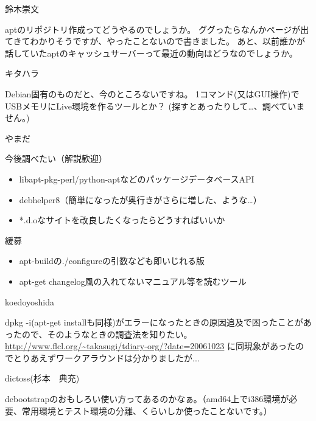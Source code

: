 
\begin{prework}{ 鈴木崇文 }

aptのリポジトリ作成ってどうやるのでしょうか。
ググったらなんかページが出てきてわかりそうですが、やったことないので書きました。
あと、以前誰かが話していたaptのキャッシュサーバーって最近の動向はどうなのでしょうか。

\end{prework}

\begin{prework}{ キタハラ }

Debian固有のものだと、今のところないですね。
1コマンド(又はGUI操作)でUSBメモリにLive環境を作るツールとか？
(探すとあったりして…、調べていません。)

\end{prework}

\begin{prework}{ やまだ }

今後調べたい（解説歓迎）
\begin{itemize}
\item libapt-pkg-perl/python-aptなどのパッケージデータベースAPI
\item debhelper8（簡単になったが奥行きがさらに増した、ような…）
\item *.d.oなサイトを改良したくなったらどうすればいいか
\end{itemize}

緩募
\begin{itemize}
\item apt-buildの./configureの引数なども即いじれる版
\item apt-get changelog風の入れてないマニュアル等を読むツール
\end{itemize}

\end{prework}

\begin{prework}{ koedoyoshida }

dpkg -i(apt-get installも同様)がエラーになったときの原因追及で困ったことがあったので、そのようなときの調査法を知りたい。
\url{http://www.flcl.org/~takasugi/tdiary-org/?date=20061023}
に同現象があったのでとりあえずワークアラウンドは分かりましたが...

\end{prework}

\begin{prework}{ dictoss(杉本　典充) }

debootstrapのおもしろい使い方ってあるのかなぁ。（amd64上でi386環境が必要、常用環境とテスト環境の分離、くらいしか使ったことないです。）
\end{prework}

